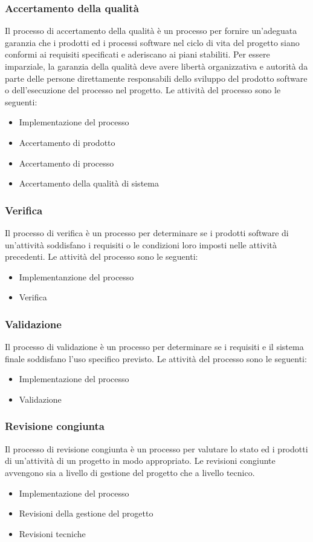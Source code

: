 \subsubsection{Accertamento della qualità}
Il processo di accertamento della qualità è un processo per fornire un'adeguata garanzia che i prodotti ed i processi software nel ciclo di vita del progetto siano conformi ai requisiti specificati e aderiscano ai piani stabiliti. Per essere imparziale, la garanzia della qualità deve avere libertà organizzativa e autorità da parte delle persone direttamente responsabili dello sviluppo del prodotto software o dell'esecuzione del processo nel progetto.
Le attività del processo sono le seguenti:
\begin{itemize}
\item Implementazione del processo
\item Accertamento di prodotto
\item Accertamento di processo
\item Accertamento della qualità di sistema
\end{itemize}
\subsubsection{Verifica}
Il processo di verifica è un processo per determinare se i prodotti software di un'attività soddisfano i requisiti o le condizioni loro imposti nelle attività precedenti.
Le attività del processo sono le seguenti:
\begin{itemize}
\item Implementanzione del processo
\item Verifica
\end{itemize}
\subsubsection{Validazione}
Il processo di validazione è un processo per determinare se i requisiti e il sistema finale soddisfano l'uso specifico previsto.
Le attività del processo sono le seguenti:
\begin{itemize}
\item Implementazione del processo
\item Validazione
\end{itemize}

\subsubsection{Revisione congiunta}
Il processo di revisione congiunta è un processo per valutare lo stato ed i prodotti di un'attività di un progetto in modo appropriato. Le revisioni congiunte avvengono sia a livello di gestione del progetto che a livello tecnico.
\begin{itemize}
\item Implementazione del processo
\item Revisioni della gestione del progetto
\item Revisioni tecniche
\end{itemize}

